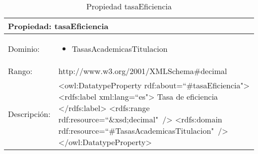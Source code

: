 \begin{table}[!ht]
	\centering
	\begin{tabular}{|p{}|p{}|}
		\hline
		\multicolumn{2}{|l|}{Propiedad: \textbf{tasaEficiencia}}
		\\ \hline
		Dominio:&
		\begin{itemize}
			\item TasasAcademicasTitulacion
		\end{itemize}
		\\ \hline
		Rango:&
		http://www.w3.org/2001/XMLSchema\#decimal
		\\ \hline
		Descripción:&
		\textless owl:DatatypeProperty rdf:about=``\#tasaEficiencia"\textgreater\newline 
		\tab\textless rdfs:label xml:lang=``es"\textgreater\newline
		\tab\tab Tasa de eficiencia\newline
		\tab\textless /rdfs:label\textgreater\newline
		\tab\textless rdfs:range\newline
		\tab\tab rdf:resource=``\&xsd;decimal"\ /\textgreater\newline
		\tab\textless rdfs:domain\newline
		\tab\tab rdf:resource=``\#TasasAcademicasTitulacion"\ /\textgreater\newline
		\textless /owl:DatatypeProperty\textgreater
		\\ \hline
	\end{tabular}
	\caption{Propiedad tasaEficiencia}
	\label{propiedad-tasaeficiencia}
\end{table}

